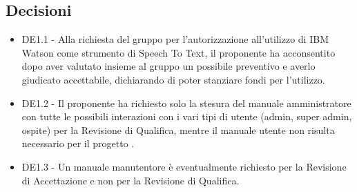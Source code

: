 \documentclass[a4paper,titlepage]{article}
\begin{document}
 \subsection{Decisioni}
 \begin{itemize}
  \item DE1.1 - Alla richiesta del gruppo per l'autorizzazione all'utilizzo di IBM Watson come strumento di Speech To Text, il proponente \PROPONENTE{} ha acconsentito dopo aver valutato insieme al gruppo \GRUPPO{} un possibile preventivo e averlo giudicato accettabile, dichiarando di poter stanziare fondi per l'utilizzo.  
  \item DE1.2 - Il proponente ha richiesto solo la stesura del manuale amministratore con tutte le possibili interazioni con i vari tipi di utente (admin, super admin, ospite) per la Revisione di Qualifica, mentre il manuale utente non risulta necessario per il progetto \PROGETTO{}.
  \item DE1.3 - Un manuale manutentore è eventualmente richiesto per la Revisione di Accettazione e non per la Revisione di Qualifica.
 \end{itemize}
\end{document}
